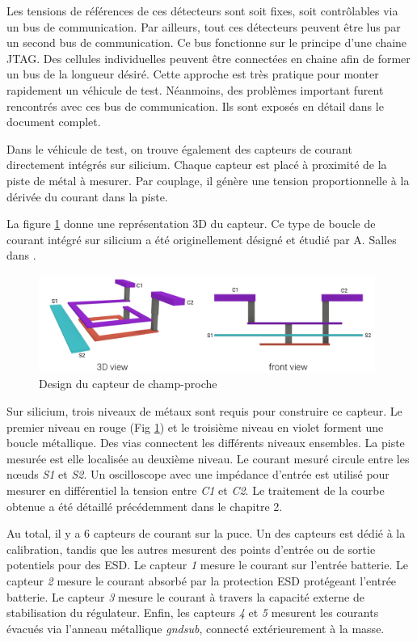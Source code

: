 Les tensions de références de ces détecteurs sont soit fixes, soit contrôlables via un bus de communication.
Par ailleurs, tout ces détecteurs peuvent être lus par un second bus de communication.
Ce bus fonctionne sur le principe d'une chaine JTAG.
Des cellules individuelles peuvent être connectées en chaine afin de former un bus de la longueur désiré.
Cette approche est très pratique pour monter rapidement un véhicule de test.
Néanmoins, des problèmes important furent rencontrés avec ces bus de communication.
Ils sont exposés en détail dans le document complet.

Dans le véhicule de test, on trouve également des capteurs de courant directement intégrés sur silicium.
Chaque capteur est placé à proximité de la piste de métal à mesurer.
Par couplage, il génère une tension proportionnelle à la dérivée du courant dans la piste.

La figure \ref{fig:near-field-current-sensor} donne une représentation 3D du capteur.
Ce type de boucle de courant intégré sur silicium a été originellement désigné et étudié par A. Salles dans \cite{AlainSallesInductors}.

\begin{figure}[!h]
  \centering
  \includegraphics[width=0.98\textwidth]{src/1/figures/near-field-current-sensor.pdf}
  \caption{Design du capteur de champ-proche}
  \label{fig:near-field-current-sensor}
\end{figure}

Sur silicium, trois niveaux de métaux sont requis pour construire ce capteur.
Le premier niveau en rouge (Fig \ref{fig:near-field-current-sensor}) et le troisième niveau en violet forment une boucle métallique.
Des vias connectent les différents niveaux ensembles.
La piste mesurée est elle localisée au deuxième niveau.
Le courant mesuré circule entre les nœuds \textit{S1} et \textit{S2}.
Un oscilloscope avec une impédance d'entrée \textOmega{} est utilisé pour mesurer en différentiel la tension entre \textit{C1} et \textit{C2}.
Le traitement de la courbe obtenue a été détaillé précédemment dans le chapitre 2.

Au total, il y a 6 capteurs de courant sur la puce.
Un des capteurs est dédié à la calibration, tandis que les autres mesurent des points d'entrée ou de sortie potentiels pour des ESD.
Le capteur \textit{1} mesure le courant sur l'entrée batterie.
Le capteur \textit{2} mesure le courant absorbé par la protection ESD protégeant l'entrée batterie.
Le capteur \textit{3} mesure le courant à travers la capacité externe de stabilisation du régulateur.
Enfin, les capteurs \textit{4} et \textit{5} mesurent les courants évacués via l'anneau métallique \textit{gndsub}, connecté extérieurement à la masse.
